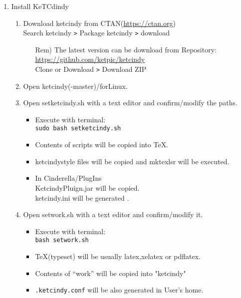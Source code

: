 \documentclass{article}
\begin{document}
\begin{enumerate}[\bf\large 1.]
\item Install KeTCdindy
  \begin{enumerate}[(1)]
  \item Download ketcindy from CTAN(\url{https://ctan.org})\\
  \hspace*{10mm}Search ketcindy \verb|>| Pack­age ketcindy \verb|>| download
    \begin{itemize}
    \item[Rem)]The latest version can be download from Repository:\\
        \hspace*{5mm}\url{https://github.com/ket­pic/ketcindy}\\
        \hspace*{10mm}Clone or Download \verb|>| Download ZIP
    \end{itemize}
  \item Open ketcindy(-master)/forLinux.
  \item Open setketcindy.sh with a text editor and confirm/modify the paths.
    \begin{itemize}
    \item Execute with terminal:\\
    \hspace*{10mm}\verb|sudo bash setketcindy.sh|
    \item Contents of scripts will be copied into TeX.
    \item ketcindystyle files will be copied and mktexlsr will be executed.
    \item In Cinderella/PlugIns\\
    \hspace*{5mm}KetcindyPluign.jar will be copied.\\
    \hspace*{5mm}ketcindy.ini will be generated .
    \end{itemize}
  \item Open setwork.sh with a text editor and confirm/modify it.
    \begin{itemize}
    \item Execute with terminal:\\
    \hspace*{10mm}\verb|bash setwork.sh|
    \item TeX(typeset) will be usually latex,xelatex or pdflatex.
    \item Contents of “work” will be copied into "ketcindy"
    \item \verb|.ketcindy.conf| will be also generated in User's home.\\

\end{itemize}
\end{enumerate}
\end{enumerate}
\end{document}
